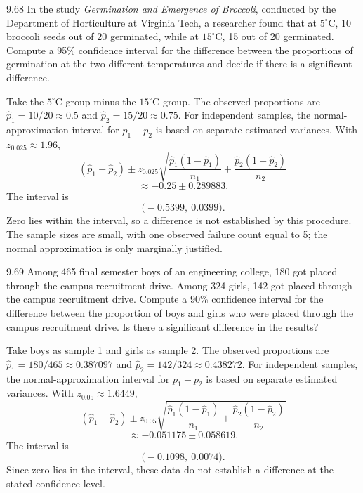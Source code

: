 \documentclass[11pt,oneside]{article}
\begin{document}
\begin{exercise}{9.68}
In the study \textit{Germination and Emergence of Broccoli}, conducted by the Department of Horticulture at Virginia Tech, a researcher found that at $5^{\circ}\mathrm C$, 10 broccoli seeds out of 20 germinated, while at $15^{\circ}\mathrm C$, 15 out of 20 germinated. Compute a 95\% confidence interval for the difference between the proportions of germination at the two different temperatures and decide if there is a significant difference.
\end{exercise}
\begin{solution}
Take the $5^{\circ}\mathrm C$ group minus the $15^{\circ}\mathrm C$ group. The observed proportions are $\hat p_1=10/20\approx0.5$ and $\hat p_2=15/20\approx0.75$. For independent samples, the normal-approximation interval for $p_1-p_2$ is based on separate estimated variances. With $z_{0.025}\approx1.96$,
\[
(\hat p_1-\hat p_2)\pm z_{0.025}\sqrt{\frac{\hat p_1(1-\hat p_1)}{n_1}+\frac{\hat p_2(1-\hat p_2)}{n_2}}
\]
\[
\approx -0.25\pm0.289883.
\]
The interval is 
\[
\boxed{\bigl(-0.5399,\ 0.0399\bigr)}.
\]
Zero lies within the interval, so a difference is not established by this procedure. The sample sizes are small, with one observed failure count equal to 5; the normal approximation is only marginally justified.
\end{solution}

\begin{exercise}{9.69}
Among 465 final semester boys of an engineering college, 180 got placed through the campus recruitment drive. Among 324 girls, 142 got placed through the campus recruitment drive. Compute a 90\% confidence interval for the difference between the proportion of boys and girls who were placed through the campus recruitment drive. Is there a significant difference in the results?
\end{exercise}
\begin{solution}
Take boys as sample 1 and girls as sample 2. The observed proportions are $\hat p_1=180/465\approx0.387097$ and $\hat p_2=142/324\approx0.438272$. For independent samples, the normal-approximation interval for $p_1-p_2$ is based on separate estimated variances. With $z_{0.05}\approx1.6449$,
\[
(\hat p_1-\hat p_2)\pm z_{0.05}\sqrt{\frac{\hat p_1(1-\hat p_1)}{n_1}+\frac{\hat p_2(1-\hat p_2)}{n_2}}
\]
\[
\approx -0.051175\pm0.058619.
\]
The interval is 
\[
\boxed{\bigl(-0.1098,\ 0.0074\bigr)}.
\]
Since zero lies in the interval, these data do not establish a difference at the stated confidence level.
\end{solution}
\end{document}

